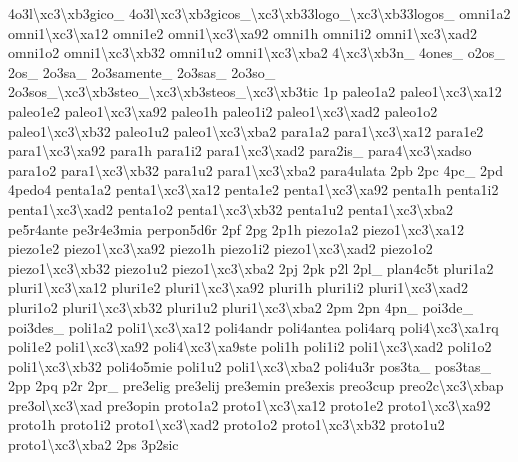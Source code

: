 \begin{DoxyCompactItemize}
4o3l\textbackslash{}xc3\textbackslash{}xb3gico\-\_\- 4o3l\textbackslash{}xc3\textbackslash{}xb3gicos\-\_\textbackslash{}xc3\textbackslash{}xb33logo\-\_\textbackslash{}xc3\textbackslash{}xb33logos\-\_\- omni1a2 omni1\textbackslash{}xc3\textbackslash{}xa12 omni1e2 omni1\textbackslash{}xc3\textbackslash{}xa92 omni1h omni1i2 omni1\textbackslash{}xc3\textbackslash{}xad2 omni1o2 omni1\textbackslash{}xc3\textbackslash{}xb32 omni1u2 omni1\textbackslash{}xc3\textbackslash{}xba2 4\textbackslash{}xc3\textbackslash{}xb3n\-\_\- 4ones\-\_\- o2os\-\_\- 2os\-\_\- 2o3sa\-\_\- 2o3samente\-\_\- 2o3sas\-\_\- 2o3so\-\_\- 2o3sos\-\_\textbackslash{}xc3\textbackslash{}xb3steo\-\_\textbackslash{}xc3\textbackslash{}xb3steos\-\_\textbackslash{}xc3\textbackslash{}xb3tic 1p paleo1a2 paleo1\textbackslash{}xc3\textbackslash{}xa12 paleo1e2 paleo1\textbackslash{}xc3\textbackslash{}xa92 paleo1h paleo1i2 paleo1\textbackslash{}xc3\textbackslash{}xad2 paleo1o2 paleo1\textbackslash{}xc3\textbackslash{}xb32 paleo1u2 paleo1\textbackslash{}xc3\textbackslash{}xba2 para1a2 para1\textbackslash{}xc3\textbackslash{}xa12 para1e2 para1\textbackslash{}xc3\textbackslash{}xa92 para1h para1i2 para1\textbackslash{}xc3\textbackslash{}xad2 para2is\-\_\- para4\textbackslash{}xc3\textbackslash{}xadso para1o2 para1\textbackslash{}xc3\textbackslash{}xb32 para1u2 para1\textbackslash{}xc3\textbackslash{}xba2 para4ulata 2pb 2pc 4pc\-\_\- 2pd 4pedo4 penta1a2 penta1\textbackslash{}xc3\textbackslash{}xa12 penta1e2 penta1\textbackslash{}xc3\textbackslash{}xa92 penta1h penta1i2 penta1\textbackslash{}xc3\textbackslash{}xad2 penta1o2 penta1\textbackslash{}xc3\textbackslash{}xb32 penta1u2 penta1\textbackslash{}xc3\textbackslash{}xba2 pe5r4ante pe3r4e3mia perpon5d6r 2pf 2pg 2p1h piezo1a2 piezo1\textbackslash{}xc3\textbackslash{}xa12 piezo1e2 piezo1\textbackslash{}xc3\textbackslash{}xa92 piezo1h piezo1i2 piezo1\textbackslash{}xc3\textbackslash{}xad2 piezo1o2 piezo1\textbackslash{}xc3\textbackslash{}xb32 piezo1u2 piezo1\textbackslash{}xc3\textbackslash{}xba2 2pj 2pk p2l 2pl\-\_\- plan4c5t pluri1a2 pluri1\textbackslash{}xc3\textbackslash{}xa12 pluri1e2 pluri1\textbackslash{}xc3\textbackslash{}xa92 pluri1h pluri1i2 pluri1\textbackslash{}xc3\textbackslash{}xad2 pluri1o2 pluri1\textbackslash{}xc3\textbackslash{}xb32 pluri1u2 pluri1\textbackslash{}xc3\textbackslash{}xba2 2pm 2pn 4pn\-\_\- poi3de\-\_\- poi3des\-\_\- poli1a2 poli1\textbackslash{}xc3\textbackslash{}xa12 poli4andr poli4antea poli4arq poli4\textbackslash{}xc3\textbackslash{}xa1rq poli1e2 poli1\textbackslash{}xc3\textbackslash{}xa92 poli4\textbackslash{}xc3\textbackslash{}xa9ste poli1h poli1i2 poli1\textbackslash{}xc3\textbackslash{}xad2 poli1o2 poli1\textbackslash{}xc3\textbackslash{}xb32 poli4o5mie poli1u2 poli1\textbackslash{}xc3\textbackslash{}xba2 poli4u3r pos3ta\-\_\- pos3tas\-\_\- 2pp 2pq p2r 2pr\-\_\- pre3elig pre3elij pre3emin pre3exis preo3cup preo2c\textbackslash{}xc3\textbackslash{}xbap pre3ol\textbackslash{}xc3\textbackslash{}xad pre3opin proto1a2 proto1\textbackslash{}xc3\textbackslash{}xa12 proto1e2 proto1\textbackslash{}xc3\textbackslash{}xa92 proto1h proto1i2 proto1\textbackslash{}xc3\textbackslash{}xad2 proto1o2 proto1\textbackslash{}xc3\textbackslash{}xb32 proto1u2 proto1\textbackslash{}xc3\textbackslash{}xba2 2ps 3p2sic 
\end{DoxyCompactItemize}
